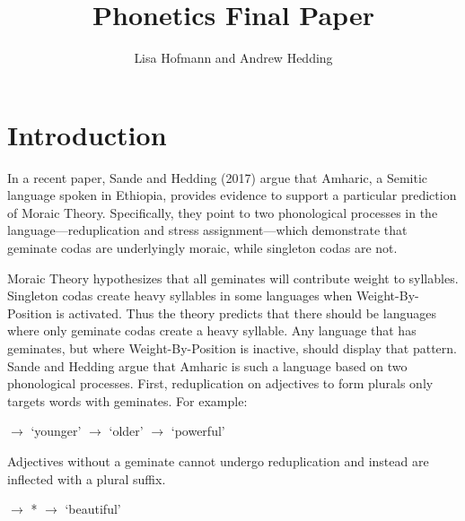 \documentclass[12pt]{article}
\title{Phonetics Final Paper}
\author{Lisa Hofmann and Andrew Hedding}
\begin{document}
\maketitle
\section{Introduction}

In a recent paper, Sande and Hedding (2017) argue that Amharic, a Semitic language spoken in Ethiopia, provides evidence to support a particular prediction of Moraic Theory. Specifically, they point to two phonological processes in the language---reduplication and stress assignment---which demonstrate that geminate codas are underlyingly moraic, while singleton codas are not. 

Moraic Theory hypothesizes that all geminates will contribute weight to syllables. Singleton codas create heavy syllables in some languages when Weight-By-Position is activated. Thus the theory predicts that there should be languages where only geminate codas create a heavy syllable. Any language that has geminates, but where Weight-By-Position is inactive, should display that pattern. Sande and Hedding argue that Amharic is such a language based on two phonological processes. First, reduplication on adjectives to form plurals only targets words with geminates. For example:

\begin{exe}
\begin{xlist}
\ex 	{} $\rightarrow$  \hspace{1cm} `younger'
\ex 	{} $\rightarrow$  \hspace{1.18cm} `older'
\ex 	{} $\rightarrow$  \hspace{1.37cm} `powerful'
\end{xlist}
\end{exe}

Adjectives without a geminate cannot undergo reduplication and instead are inflected with a plural suffix. 

\begin{exe}
\begin{xlist}
\ex 	{} $\rightarrow$ * 
\ex 	{} $\rightarrow$  \hspace{1cm} `beautiful'
\end{xlist}
\end{exe}
\end{document}
